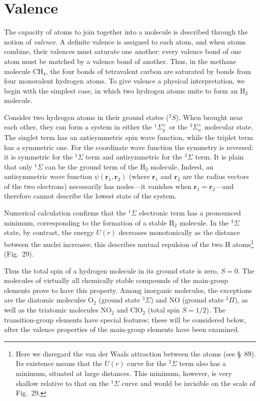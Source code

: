 \section{Valence}

The capacity of atoms to join together into a molecule is described through the notion of \emph{valence}. A definite valence is assigned to each atom, and when atoms combine, their valences must saturate one another: every valence bond of one atom must be matched by a valence bond of another. Thus, in the methane molecule $\mathrm{CH}_4$, the four bonds of tetravalent carbon are saturated by bonds from four monovalent hydrogen atoms. To give valence a physical interpretation, we begin with the simplest case, in which two hydrogen atoms unite to form an $\mathrm H_2$ molecule.

Consider two hydrogen atoms in their ground states (${}^2S$). When brought near each other, they can form a system in either the ${}^1\Sigma_g^+$ or the ${}^3\Sigma_u^+$ molecular state. The singlet term has an antisymmetric spin wave function, while the triplet term has a symmetric one. For the coordinate wave function the symmetry is reversed: it is symmetric for the ${}^1\Sigma$ term and antisymmetric for the ${}^3\Sigma$ term. It is plain that only ${}^1\Sigma$ can be the ground term of the $\mathrm H_2$ molecule. Indeed, an antisymmetric wave function $\psi(\mathbf r_1,\mathbf r_2)$ (where $\mathbf r_1$ and $\mathbf r_2$ are the radius vectors of the two electrons) necessarily has nodes---it vanishes when $\mathbf r_1=\mathbf r_2$---and therefore cannot describe the lowest state of the system.

Numerical calculation confirms that the ${}^1\Sigma$ electronic term has a pronounced minimum, corresponding to the formation of a stable $\mathrm H_2$ molecule. In the ${}^3\Sigma$ state, by contrast, the energy $U(r)$ decreases monotonically as the distance between the nuclei increases; this describes mutual repulsion of the two H atoms\footnote{Here we disregard the van der Waals attraction between the atoms (see \S~89). Its existence means that the $U(r)$ curve for the ${}^3\Sigma$ term also has a minimum, situated at large distances. This minimum, however, is very shallow relative to that on the ${}^1\Sigma$ curve and would be invisible on the scale of Fig.~29.} (Fig.~29).

Thus the total spin of a hydrogen molecule in its ground state is zero, $S=0$. The molecules of virtually all chemically stable compounds of the main-group elements prove to have this property. Among inorganic molecules, the exceptions are the diatomic molecules $\mathrm O_2$ (ground state ${}^3\Sigma$) and NO (ground state ${}^2\Pi$), as well as the triatomic molecules $\mathrm{NO}_2$ and $\mathrm{ClO}_2$ (total spin $S=1/2$). The transition-group elements have special features; these will be considered below, after the valence properties of the main-group elements have been examined.

